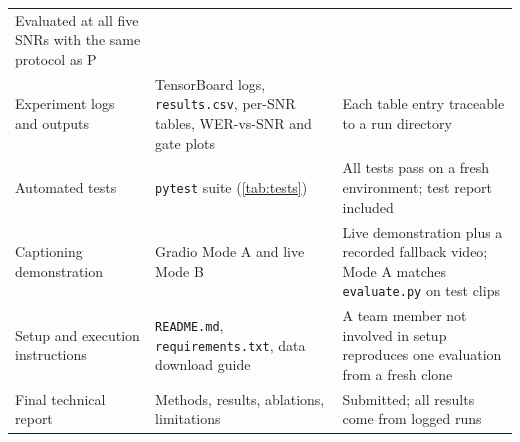 {\begin{longtable}{@{}p{3.5cm}p{5.4cm}p{6.2cm}@{}}
Evaluated at all five SNRs with the same protocol as P \\
Experiment logs and outputs & TensorBoard logs, \texttt{results.csv}, per-SNR tables, WER-vs-SNR and gate plots &
Each table entry traceable to a run directory \\
Automated tests & \texttt{pytest} suite (\cref{tab:tests}) &
All tests pass on a fresh environment; test report included \\
Captioning demonstration & Gradio Mode A and live Mode B &
Live demonstration plus a recorded fallback video; Mode A matches \texttt{evaluate.py} on test clips \\
Setup and execution instructions & \texttt{README.md}, \texttt{requirements.txt}, data download guide &
A team member not involved in setup reproduces one evaluation from a fresh clone \\
Final technical report & Methods, results, ablations, limitations &
Submitted; all results come from logged runs \\
\end{longtable}
}
